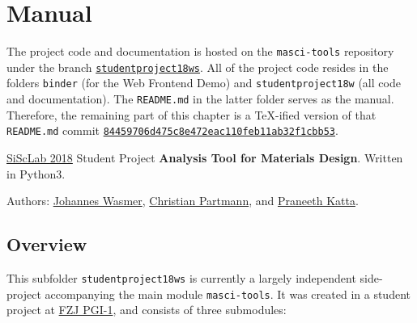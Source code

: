 
\chapter{Manual}
\label{cha:manual}

The project code and documentation is hosted on the \texttt{masci-tools}
repository \cite{masci-tools} under the branch
\href{https://github.com/JuDFTteam/masci-tools/tree/studentproject18ws}{\texttt{studentproject18ws}}.
All of the project code resides in the folders \texttt{binder} (for the Web
Frontend Demo) and \texttt{studentproject18w} (all code and documentation). The
\texttt{README.md} in the latter folder serves as the manual. Therefore, the
remaining part of this chapter is a \TeX{}-ified version of that
\texttt{README.md} commit
\href{https://github.com/JuDFTteam/masci-tools/tree/84459706d475c8e472eac110feb11ab32f1cbb53
}{\texttt{84459706d475c8e472eac110feb11ab32f1cbb53}}.

\vspace{3em}
\hdashrule{\textwidth}{2pt}{2pt}

\href{https://www.aices.rwth-aachen.de/en/academics/masters-program-simulation-sciences}{SiScLab
2018} Student Project \textbf{Analysis Tool for Materials
  Design}. Written in Python3.

Authors: \href{https://github.com/Irratzo}{Johannes Wasmer},
\href{https://github.com/ChristianPartmann}{Christian Partmann}, and
\href{https://github.com/PraneethKatta}{Praneeth Katta}.

\section{Overview}\label{overview}

This subfolder \texttt{studentproject18ws} is currently a largely
independent side-project accompanying the main module
\texttt{masci-tools}. It was created in a student project at \href{http://www.fz-juelich.de/pgi/pgi-1/EN/Home/home_node.html}{FZJ PGI-1}, and consists
of three submodules:

